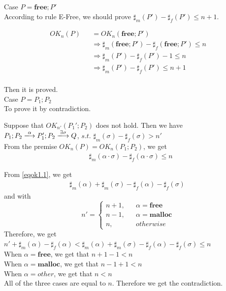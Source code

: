 \documentclass[english]{jssst_ppl} %
\newcommand\Malloc{\mathbf{malloc}}
\newcommand\Free{\mathbf{free}}
\theoremstyle{definition}
\begin{document}
\noindent Case $P = \Free;P'$ \\

According to rule E-Free, we should prove $\sharp_{m}(P') - \sharp_{f}(P') \le n+1$.

\begin{eqnarray*}
  OK_{n}(P)  & & =  OK_{n}(\Free;P')\\
  & &\Rightarrow  \sharp_{m}(\Free;P') - \sharp_{f}(\Free;P') \le n \\
  & & \Rightarrow \sharp_{m}(P')  - \sharp_{f}(P') - 1  \le n\\
  & & \Rightarrow \sharp_{m}(P')  - \sharp_{f}(P') \le n+1\\
\end{eqnarray*}

Then it is proved. \\

\noindent Case $P = P_{1};P_{2}$\\

To prove it by contradiction.

Suppose that $OK_{n'}(P_{1}';P_{2})$ does not hold. Then we have 
$P_{1};P_{2} \xlongrightarrow{\alpha} P_{1}';P_{2} \xlongrightarrow{\exists \sigma} Q$, $s.t.$ $\sharp_{m}(\sigma) - \sharp_{f}(\sigma) > n'$\\

From the premise $OK_{n}(P) = OK_{n}(P_{1};P_{2})$, we get 
\setcounter{equation}{0}
\begin{align}
  &  \sharp_{m}(\alpha \cdot \sigma) - \sharp_{f}(\alpha \cdot \sigma) \le n \label{eqok1.1}
\end{align}

From \eqref{eqok1.1}, we get
\begin{align}
\sharp_{m}(\alpha) + \sharp_{m}(\sigma) - \sharp_{f}(\alpha) - \sharp_{f}(\sigma) \  \label{eqok1.2}
\end{align}
and with
$$
   n'=\left\{
   \begin{aligned}
     n + 1, && \alpha = \Free \\
     n - 1,  && \alpha = \Malloc  \\
     n ,      && otherwise
   \end{aligned}
   \right.
$$
Therefore, we get \\
$n' + \sharp_{m}(\alpha) - \sharp_{f}(\alpha) < \sharp_{m}(\alpha) + \sharp_{m}(\sigma) - \sharp_{f}(\alpha) - \sharp_{f}(\sigma) \le n $ \\
When $\alpha = \Free$, we get that $n + 1 - 1 < n$\\
When $\alpha = \Malloc$, we get that $ n - 1 + 1 < n $ \\
When $ \alpha = other$,  we  get that $ n < n $ \\
 All of the three cases are equal to $n$. Therefore we get the contradiction.
\end{document}
